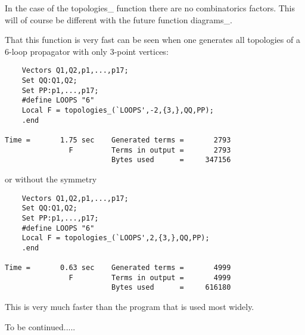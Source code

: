 In the case of the topologies\_ function there are no combinatorics 
factors. This will of course be different with the future function 
diagrams\_.

That this function is very fast can be seen when one generates all 
topologies of a 6-loop propagator with only 3-point vertices:
\begin{verbatim}
    Vectors Q1,Q2,p1,...,p17;
    Set QQ:Q1,Q2;
    Set PP:p1,...,p17;
    #define LOOPS "6"
    Local F = topologies_(`LOOPS',-2,{3,},QQ,PP);
    .end

Time =       1.75 sec    Generated terms =       2793
               F         Terms in output =       2793
                         Bytes used      =     347156
\end{verbatim}
or without the symmetry
\begin{verbatim}
    Vectors Q1,Q2,p1,...,p17;
    Set QQ:Q1,Q2;
    Set PP:p1,...,p17;
    #define LOOPS "6"
    Local F = topologies_(`LOOPS',2,{3,},QQ,PP);
    .end

Time =       0.63 sec    Generated terms =       4999
               F         Terms in output =       4999
                         Bytes used      =     616180
\end{verbatim}
This is very much faster than the program that is used most widely.

To be continued.....

